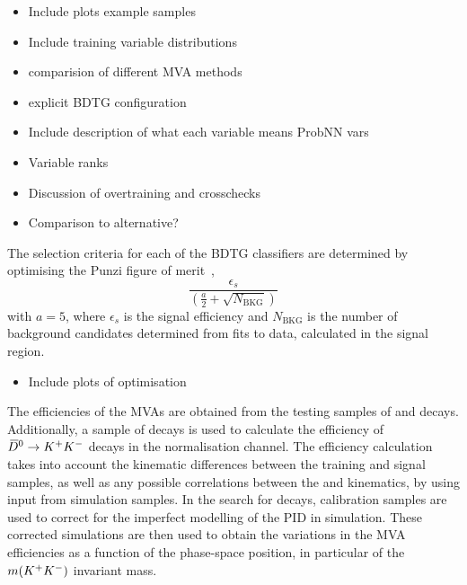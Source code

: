 {\color{Red}
\begin{itemize}
\item Include plots example samples
\item Include training variable distributions
\item comparision of different MVA methods
\item explicit BDTG configuration
\item Include description of what each variable means \eg ProbNN vars
\item Variable ranks
\item Discussion of overtraining and crosschecks
\item Comparison to alternative? 
\end{itemize}
}
 


The selection criteria for each of the BDTG classifiers are determined by optimising the Punzi figure of merit~\cite{Punzi:2003bu}, 
\begin{equation}
\frac{\epsilon_{s}}{(\frac{a}{2} + \sqrt{N_{\text{BKG}}})}
\end{equation}
with $a=5$, where $\epsilon_{s}$ is the signal efficiency and $N_{\text{BKG}}$ is the number of background candidates determined from fits to data, calculated in the signal region.

{\color{Red}
\begin{itemize}
\item Include plots of optimisation
\end{itemize}
}



The efficiencies of the MVAs are obtained from the testing samples of \decay{\Bs}{\jpsi\phiz} and \decay{\Bs}{\Dsp\pim} decays. Additionally, a sample of \decay{\Bp}{\Dz\pip} decays is used to calculate the efficiency of ${{\kern 0.2em\overline{\kern -0.2em D}{}}{}^0} \rightarrow {\ensuremath{{K}^+}} {\ensuremath{{K}^-}}$ decays in the normalisation channel. The efficiency calculation takes into account the kinematic differences between the training and signal samples, as well as any possible correlations between the \Dsp and \phiz kinematics, by using input from simulation samples. In the search for \decay{\Bp}{\Dsp\Kp\Km} decays, calibration samples are used to correct for the imperfect modelling of the PID in simulation. These corrected simulations are then used to obtain the variations in the MVA efficiencies as a function of the phase-space position, in particular of the $m({{K}^+}{{K}^-})$ invariant mass.

